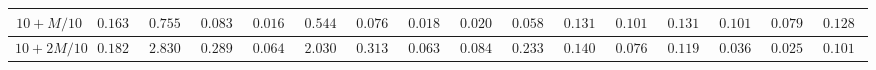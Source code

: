 \begin{table}[]
\begin{tabular}{|c|c|c|c|c|c|c|c|c|c|c|c|c|c|c|c}
$10 + M/10$  & $0.163500$                                                        & $0.755600$                                                        & $0.083700$                                                          & $0.016800$                                                           & $0.544900$                                                              & $0.076400$                                                        & $0.018000$                                                          & $0.020400$                                                           & $0.058900$                                                              & $0.131900$                                                        & $0.101500$                                                          & $0.131460$                                                        & $0.101170$                                                          & $0.079300$                                                           & \multicolumn{1}{c|}{$0.128900$}                                                              \\ \hline
$10 + 2M/10$ & $0.182500$                                                        & $2.830000$                                                        & $0.289400$                                                          & $0.064200$                                                           & $2.030300$                                                              & $0.313400$                                                        & $0.063600$                                                          & $0.084600$                                                           & $0.233300$                                                              & $0.140800$                                                        & $0.076400$                                                          & $0.119010$                                                        & $0.036660$                                                          & $0.025920$                                                           & \multicolumn{1}{c|}{$0.101400$}                                                              \\ \hline

\end{tabular}
\end{table}
